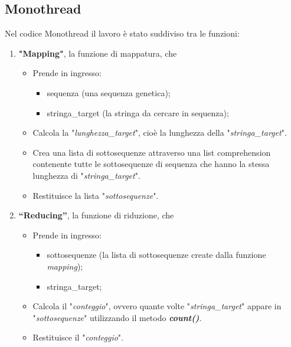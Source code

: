 \documentclass{article}
\begin{document}
    \vspace{5pt}
    
    \subsection{Monothread}
    Nel codice Monothread il lavoro è stato suddiviso tra le funzioni:
    
    \begin{enumerate}
        \item \textbf{"Mapping"}, la funzione di mappatura, che
        \begin{itemize}
            \item Prende in ingresso:
            \begin{itemize}
                \item sequenza (una sequenza genetica);
                \item stringa\_target (la stringa da cercare in sequenza);
            \end{itemize}
            \item Calcola la "\textit{lunghezza\_target}", cioè la lunghezza della "\textit{stringa\_target}".
            \item Crea una lista di sottosequenze attraverso una list comprehension contenente tutte le sottosequenze di sequenza che hanno la stessa lunghezza di "\textit{stringa\_target}".
            \item Restituisce la lista "\textit{sottosequenze}".
        \end{itemize}

        \item \textbf{“Reducing”}, la funzione di riduzione, che
        \begin{itemize}
            \item Prende in ingresso:
            \begin{itemize}
                \item sottosequenze (la lista di sottosequenze create dalla funzione \textit{mapping});
                \item stringa\_target;
            \end{itemize}
            \item Calcola il "\textit{conteggio}", ovvero quante volte "\textit{stringa\_target}" appare in "\textit{sottosequenze}" utilizzando il 
metodo \textbf{\textit{count()}}.
            \item Restituisce il "\textit{conteggio}".
        \end{itemize}


\end{enumerate}
\end{document}
